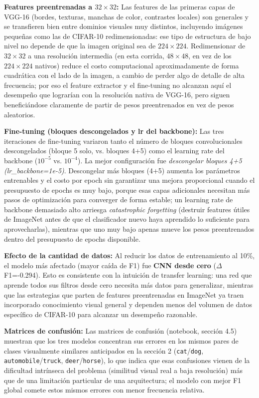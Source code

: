 \documentclass[9pt]{article}
\begin{document}
\textbf{Features preentrenadas a $32\times32$:} Las features de las primeras capas de VGG-16 (bordes, texturas, manchas de color, contrastes locales) son generales y se transfieren bien entre dominios visuales muy distintos, incluyendo imágenes pequeñas como las de CIFAR-10 redimensionadas: ese tipo de estructura de bajo nivel no depende de que la imagen original sea de $224\times224$. Redimensionar de $32\times32$ a una resolución intermedia (en esta corrida, $48\times48$, en vez de los $224\times224$ nativos) reduce el costo computacional aproximadamente de forma cuadrática con el lado de la imagen, a cambio de perder algo de detalle de alta frecuencia; por eso el feature extractor y el fine-tuning no alcanzan aquí el desempeño que lograrían con la resolución nativa de VGG-16, pero siguen beneficiándose claramente de partir de pesos preentrenados en vez de pesos aleatorios.

\textbf{Fine-tuning (bloques descongelados y lr del backbone):} Las tres iteraciones de fine-tuning variaron tanto el número de bloques convolucionales descongelados (bloque 5 solo, vs. bloques 4+5) como el learning rate del backbone ($10^{-5}$ vs. $10^{-4}$). La mejor configuración fue \emph{descongelar bloques 4+5 (lr_backbone=1e-5)}. Descongelar más bloques (4+5) aumenta los parámetros entrenables y el costo por epoch sin garantizar una mejora proporcional cuando el presupuesto de epochs es muy bajo, porque esas capas adicionales necesitan más pasos de optimización para converger de forma estable; un learning rate de backbone demasiado alto arriesga \emph{catastrophic forgetting} (destruir features útiles de ImageNet antes de que el clasificador nuevo haya aprendido lo suficiente para aprovecharlas), mientras que uno muy bajo apenas mueve los pesos preentrenados dentro del presupuesto de epochs disponible.

\textbf{Efecto de la cantidad de datos:} Al reducir los datos de entrenamiento al 10\%, el modelo más afectado (mayor caída de F1) fue \textbf{CNN desde cero} ($\Delta$F1=-0.294). Esto es consistente con la intuición de transfer learning: una red que aprende todos sus filtros desde cero necesita más datos para generalizar, mientras que las estrategias que parten de features preentrenadas en ImageNet ya traen incorporado conocimiento visual general y dependen menos del volumen de datos específico de CIFAR-10 para alcanzar un desempeño razonable.

\textbf{Matrices de confusión:} Las matrices de confusión (notebook, sección 4.5) muestran que los tres modelos concentran sus errores en los mismos pares de clases visualmente similares anticipados en la sección 2 (\texttt{cat}/\texttt{dog}, \texttt{automobile}/\texttt{truck}, \texttt{deer}/\texttt{horse}), lo que indica que esas confusiones vienen de la dificultad intrínseca del problema (similitud visual real a baja resolución) más que de una limitación particular de una arquitectura; el modelo con mejor F1 global comete estos mismos errores con menor frecuencia relativa.
\end{document}
